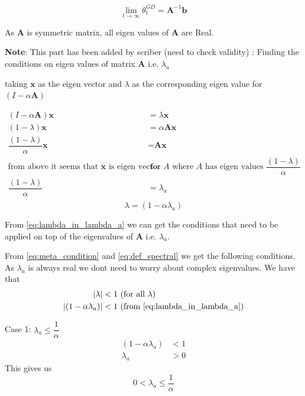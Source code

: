 \documentclass[twoside]{article}
\begin{document}
\begin{equation}
    \underset{t \rightarrow \infty}{\lim} \theta_t^{GD} = \textbf{A}^{-1}\textbf{b}
\end{equation}

As $\textbf{A}$ is symmetric matrix, all eigen values of $\textbf{A}$ are Real.

\textbf{Note}: This part has been added by scriber (need to check validity) : 
Finding the conditions on eigen values of matrix $\textbf{A}$ i.e. $\lambda_a$

taking $\textbf{x}$ as the eigen vector and $\lambda$ as the corresponding eigen value for $(I - \alpha \textbf{A})$

\begin{equation}
    \begin{split}
        (I - \alpha \textbf{A})\textbf{x} &= \lambda \textbf{x}\\
        (1 - \lambda)\textbf{x} &= \alpha \textbf{A} \textbf{x}\\
        \dfrac{(1 - \lambda)}{\alpha}\textbf{x} &= \textbf{A}\textbf{x}\\
        \text{from above it seems that $\textbf{x}$ is eigen vector}& \text{ for $A$ where $A$ has eigen values $\dfrac{(1-\lambda)}{\alpha}$ }\\
        \dfrac{(1-\lambda)}{\alpha} &= \lambda_a\\
    \end{split}
\end{equation}
\begin{equation}\label{eq:lambda_in_lambda_a}
     \lambda = (1-\alpha \lambda_a)
\end{equation}

From \ref{eq:lambda_in_lambda_a} we can get the conditions that need to be applied on top of the eigenvalues of $\textbf{A}$ i.e. $\lambda_a$.

From \ref{eq:meta_condition} and \ref{eq:def_spectral} we get the following conditions. As $\lambda_a$ is always real we dont need to worry about complex eigenvalues.
We have that 
\begin{equation}
    \begin{split}
    |\lambda| &< 1 \text{ (for all $\lambda$) }\\
    |(1 - \alpha \lambda_a) | &< 1 \text{  (from \ref{eq:lambda_in_lambda_a})}
    \end{split}
\end{equation}

Case 1: $\lambda_a \leq \dfrac{1}{\alpha}$
\begin{equation}
    \begin{split}
        (1 - \alpha \lambda_a) &< 1\\
        \lambda_a & > 0
    \end{split}
\end{equation}
This gives us 
\begin{equation}\label{eq:condition}
    0 < \lambda_a \leq \dfrac{1}{\alpha}
\end{equation}
\end{document}

